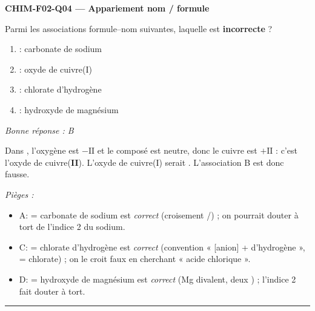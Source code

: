 \documentclass[11pt,a4paper]{article}
\begin{document}
\noindent\textbf{CHIM-F02-Q04 --- Appariement nom / formule}\par
Parmi les associations formule--nom suivantes, laquelle est \textbf{incorrecte} ?
\begin{enumerate}[label=\Alph*)]
\item {} : carbonate de sodium
\item {} : oxyde de cuivre(I)
\item {} : chlorate d'hydrogène
\item {} : hydroxyde de magnésium
\end{enumerate}
\textit{Bonne réponse : B}\par
Dans , l'oxygène est $-\mathrm{II}$ et le composé est neutre, donc le cuivre est $+\mathrm{II}$ : c'est l'oxyde de cuivre(\textbf{II}). L'oxyde de cuivre(I) serait . L'association B est donc fausse.\par
\textit{Pièges :}
\begin{itemize}
\item A:  = carbonate de sodium est \emph{correct} (croisement /) ; on pourrait douter à tort de l'indice 2 du sodium.
\item C:  = chlorate d'hydrogène est \emph{correct} (convention « [anion] + d'hydrogène »,  = chlorate) ; on le croit faux en cherchant « acide chlorique ».
\item D:  = hydroxyde de magnésium est \emph{correct} (Mg divalent, deux ) ; l'indice 2 fait douter à tort.
\end{itemize}
\vspace{8pt}\hrule\vspace{8pt}
\end{document}

